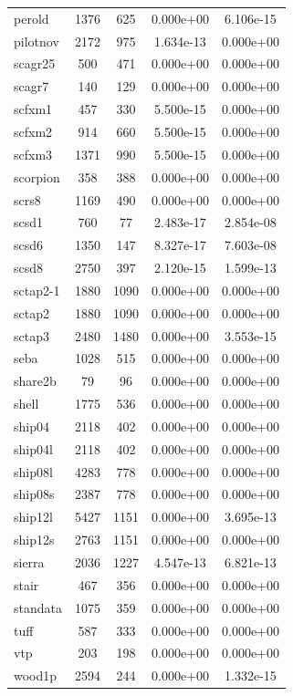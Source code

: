 \documentclass[12pt,a4paper]{article}
\begin{document}
\begin{longtable}{@{}l|cccc@{}}
perold & 1376 & 625 & 0.000e+00 & 6.106e-15 \\
pilotnov & 2172 & 975 & 1.634e-13 & 0.000e+00 \\
scagr25 & 500 & 471 & 0.000e+00 & 0.000e+00 \\
scagr7 & 140 & 129 & 0.000e+00 & 0.000e+00 \\
scfxm1 & 457 & 330 & 5.500e-15 & 0.000e+00 \\
scfxm2 & 914 & 660 & 5.500e-15 & 0.000e+00 \\
scfxm3 & 1371 & 990 & 5.500e-15 & 0.000e+00 \\
scorpion & 358 & 388 & 0.000e+00 & 0.000e+00 \\
scrs8 & 1169 & 490 & 0.000e+00 & 0.000e+00 \\
scsd1 & 760 & 77 & 2.483e-17 & 2.854e-08 \\
scsd6 & 1350 & 147 & 8.327e-17 & 7.603e-08 \\
scsd8 & 2750 & 397 & 2.120e-15 & 1.599e-13 \\
sctap2-1 & 1880 & 1090 & 0.000e+00 & 0.000e+00 \\
sctap2 & 1880 & 1090 & 0.000e+00 & 0.000e+00 \\
sctap3 & 2480 & 1480 & 0.000e+00 & 3.553e-15 \\
seba & 1028 & 515 & 0.000e+00 & 0.000e+00 \\
share2b & 79 & 96 & 0.000e+00 & 0.000e+00 \\
shell & 1775 & 536 & 0.000e+00 & 0.000e+00 \\
ship04 & 2118 & 402 & 0.000e+00 & 0.000e+00 \\
ship04l & 2118 & 402 & 0.000e+00 & 0.000e+00 \\
ship08l & 4283 & 778 & 0.000e+00 & 0.000e+00 \\
ship08s & 2387 & 778 & 0.000e+00 & 0.000e+00 \\
ship12l & 5427 & 1151 & 0.000e+00 & 3.695e-13 \\
ship12s & 2763 & 1151 & 0.000e+00 & 0.000e+00 \\
sierra & 2036 & 1227 & 4.547e-13 & 6.821e-13 \\
stair & 467 & 356 & 0.000e+00 & 0.000e+00 \\
standata & 1075 & 359 & 0.000e+00 & 0.000e+00 \\
tuff & 587 & 333 & 0.000e+00 & 0.000e+00 \\
vtp & 203 & 198 & 0.000e+00 & 0.000e+00 \\
wood1p & 2594 & 244 & 0.000e+00 & 1.332e-15 \\

\bottomrule
\end{longtable}
\end{document}
